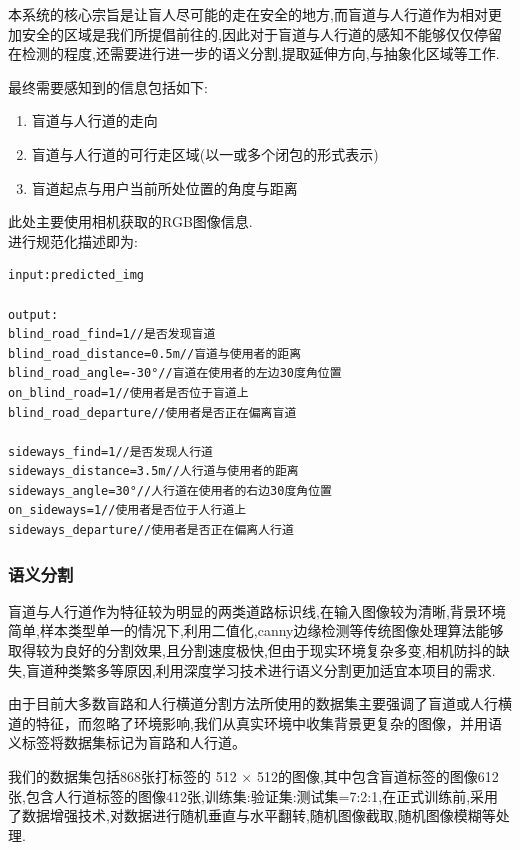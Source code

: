 \documentclass[]{article}
\begin{document}
本系统的核心宗旨是让盲人尽可能的走在安全的地方,而盲道与人行道作为相对更加安全的区域是我们所提倡前往的,因此对于盲道与人行道的感知不能够仅仅停留在检测的程度,还需要进行进一步的语义分割,提取延伸方向,与抽象化区域等工作.

最终需要感知到的信息包括如下:

\begin{enumerate}
\def\labelenumi{\arabic{enumi}.}
\item
  盲道与人行道的走向
\item
  盲道与人行道的可行走区域(以一或多个闭包的形式表示)
\item
  盲道起点与用户当前所处位置的角度与距离
\end{enumerate}

此处主要使用相机获取的RGB图像信息.\\
进行规范化描述即为:

\begin{verbatim}
input:predicted_img

output:
blind_road_find=1//是否发现盲道
blind_road_distance=0.5m//盲道与使用者的距离
blind_road_angle=-30°//盲道在使用者的左边30度角位置
on_blind_road=1//使用者是否位于盲道上
blind_road_departure//使用者是否正在偏离盲道

sideways_find=1//是否发现人行道
sideways_distance=3.5m//人行道与使用者的距离
sideways_angle=30°//人行道在使用者的右边30度角位置
on_sideways=1//使用者是否位于人行道上
sideways_departure//使用者是否正在偏离人行道
\end{verbatim}

\hypertarget{ux8bedux4e49ux5206ux5272}{%
\subsubsection{语义分割}\label{ux8bedux4e49ux5206ux5272}}

盲道与人行道作为特征较为明显的两类道路标识线,在输入图像较为清晰,背景环境简单,样本类型单一的情况下,利用二值化,canny边缘检测等传统图像处理算法能够取得较为良好的分割效果,且分割速度极快,但由于现实环境复杂多变,相机防抖的缺失,盲道种类繁多等原因,利用深度学习技术进行语义分割更加适宜本项目的需求.

由于目前大多数盲路和人行横道分割方法所使用的数据集主要强调了盲道或人行横道的特征，而忽略了环境影响,我们从真实环境中收集背景更复杂的图像，并用语义标签将数据集标记为盲路和人行道。

我们的数据集包括868张打标签的 512 ×
512的图像,其中包含盲道标签的图像612张,包含人行道标签的图像412张,训练集:验证集:测试集=7:2:1,在正式训练前,采用了数据增强技术,对数据进行随机垂直与水平翻转,随机图像截取,随机图像模糊等处理.
\end{document}
